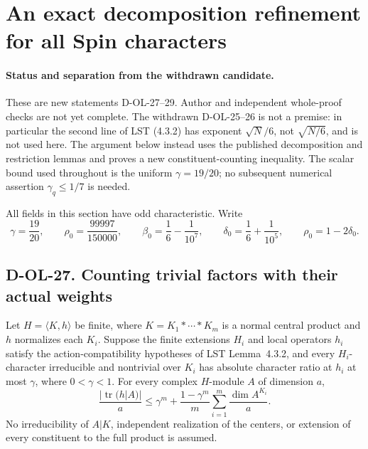 \section{An exact decomposition refinement for all Spin characters}
\label{sec:spin-parameter-optimization}

\paragraph{Status and separation from the withdrawn candidate.}
These are new statements D-OL-27--29.  Author and independent whole-proof
checks are not yet complete.  The withdrawn D-OL-25--26 is not a premise:
in particular the second line of LST (4.3.2) has exponent
$\sqrt N/6$, not $\sqrt{N/6}$, and is not used here.
The argument below instead uses the published decomposition and
restriction lemmas and proves a new constituent-counting inequality.
The scalar bound used throughout is the uniform $\gamma=19/20$;
no subsequent numerical assertion $\gamma_q\le1/7$ is needed.

All fields in this section have odd characteristic.  Write
\[
 \gamma=\frac{19}{20},\qquad
 \rho_0=\frac{99997}{150000},\qquad
 \beta_0=\frac16-\frac1{10^7},\qquad
 \delta_0=\frac16+\frac1{10^5},\qquad \rho_0=1-2\delta_0.
 \tag{SPO.1}
\]

\subsection*{D-OL-27. Counting trivial factors with their actual weights}

\begin{lemma}[D-OL-27]
Let $H=\langle K,h\rangle$ be finite, where
$K=K_1*\cdots*K_m$ is a normal central product and $h$ normalizes
each $K_i$.  Suppose the finite extensions $H_i$ and local operators
$h_i$ satisfy the action-compatibility hypotheses of LST Lemma~4.3.2,
and every $H_i$-character irreducible and nontrivial over $K_i$ has
absolute character ratio at $h_i$ at most $\gamma$, where $0<\gamma<1$.
For every complex $H$-module $A$ of dimension $a$,
\[
 \frac{|\operatorname{tr}(h|A)|}{a}
 \le\gamma^m+
       \frac{1-\gamma^m}{m}
          \sum_{i=1}^m\frac{\dim A^{K_i}}a.
 \tag{SPO.2}
\]
No irreducibility of $A|K$, independent realization of the centers,
or extension of every constituent to the full product is assumed.
\end{lemma}

